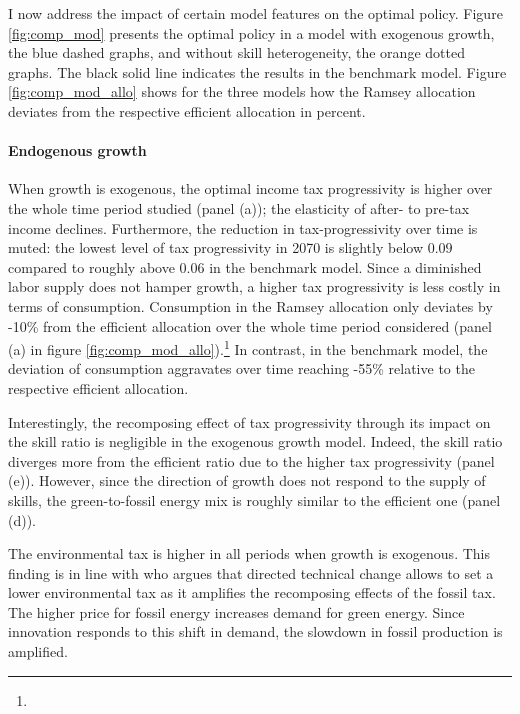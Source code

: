 I now address the impact of certain model features on the optimal policy. 
Figure \ref{fig:comp_mod} presents the optimal policy in a model with exogenous growth, the blue dashed graphs, and without skill heterogeneity, the orange dotted graphs. The black solid line indicates the results in the benchmark model. Figure \ref{fig:comp_mod_allo} shows for the three models how the Ramsey allocation deviates from the respective efficient allocation in percent. 

\paragraph{Endogenous growth}
When growth is exogenous, the optimal income tax progressivity is higher over the whole time period studied (panel (a)); the elasticity of after- to pre-tax income declines. Furthermore, the reduction in tax-progressivity over time is muted: the lowest level of tax progressivity in 2070 is slightly below $0.09$ compared to roughly above $0.06$ in the benchmark model. 
Since a diminished labor supply does not hamper growth, a higher tax progressivity is less costly in terms of consumption. Consumption in the Ramsey allocation only deviates by -10\% from the efficient allocation over the whole time period considered (panel (a) in figure \ref{fig:comp_mod_allo}).\footnote{ } In contrast, in the benchmark model, the deviation of consumption aggravates over time reaching -55\% relative to the respective efficient allocation. 

Interestingly, the recomposing effect of tax progressivity through its impact on the skill ratio is negligible in the exogenous growth model. Indeed, the skill ratio diverges more from the efficient ratio due to the higher tax progressivity (panel (e)). However, since the direction of growth does not respond to the supply of skills, the green-to-fossil energy mix is roughly similar to the efficient one (panel (d)). 

The environmental tax is higher in all periods when growth is exogenous. This finding is in line with \cite{Fried2018ClimateAnalysis} who argues that directed technical change allows to set a lower environmental tax as it amplifies the recomposing effects of the fossil tax. The higher price for fossil energy increases demand for green energy. Since innovation responds to this shift in demand, the slowdown in fossil production is amplified. 




